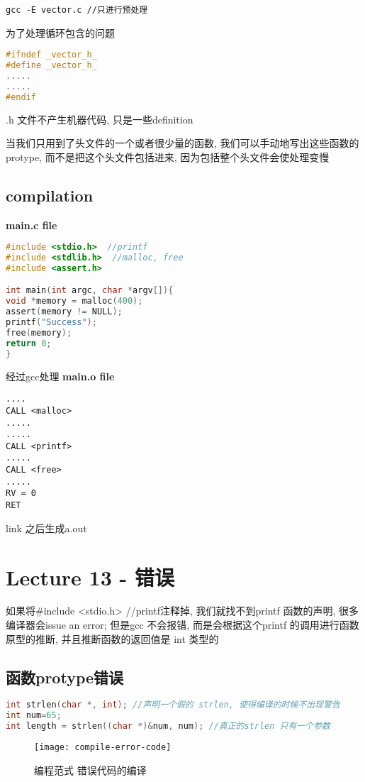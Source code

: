 \documentclass{article}
\begin{document}
\begin{verbatim}
gcc -E vector.c //只进行预处理
\end{verbatim}

为了处理循环包含的问题
\begin{lstlisting}[language = C]
#ifndef _vector_h_
#define _vector_h_
.....
.....
#endif
\end{lstlisting}
.h 文件不产生机器代码, 只是一些definition

当我们只用到了头文件的一个或者很少量的函数, 我们可以手动地写出这些函数的protype, 而不是把这个头文件包括进来, 因为包括整个头文件会使处理变慢

\subsection{compilation}
\textbf{main.c file}\\
\begin{lstlisting}[language = C]
#include <stdio.h>  //printf
#include <stdlib.h>  //malloc, free
#include <assert.h>

int main(int argc, char *argv[]){
void *memory = malloc(400);
assert(memory != NULL);
printf("Success");
free(memory);
return 0;
}
\end{lstlisting}

经过gcc处理
\textbf{main.o file}
\begin{verbatim}
....
CALL <malloc>
.....
.....
CALL <printf>
.....
CALL <free>
.....
RV = 0
RET
\end{verbatim}
link 之后生成a.out

\section{Lecture 13 - 错误}
如果将\#include <stdio.h>  //printf注释掉, 我们就找不到printf 函数的声明, 很多编译器会issue an error; 但是gcc 不会报错, 而是会根据这个printf 的调用进行函数原型的推断, 并且推断函数的返回值是 int 类型的

\subsection{函数protype错误}
\begin{lstlisting}[language = C]
int strlen(char *, int); //声明一个假的 strlen, 使得编译的时候不出现警告
int num=65;
int length = strlen((char *)&num, num); //真正的strlen 只有一个参数
\end{lstlisting}
\begin{figure}[htbp]
	\centering
	\texttt{[image: compile-error-code]}\\
	\caption{编程范式 错误代码的编译}\label{fig.compile-error-code}
\end{figure}
\end{document}

